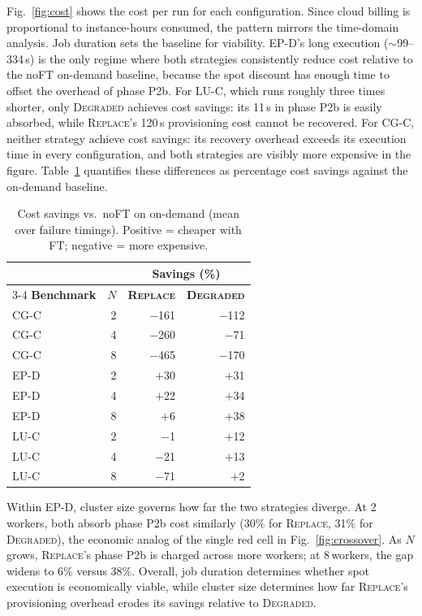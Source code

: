 \documentclass[conference]{IEEEtran}
\begin{document}
Fig.~\ref{fig:cost} shows the cost per run for each configuration. Since cloud billing
is proportional to instance-hours consumed, the pattern mirrors the time-domain analysis.
Job duration sets the baseline for viability.
EP-D's long execution ($\sim$99--334\,s) is the only regime where both strategies
consistently reduce cost relative to the noFT on-demand baseline, because the spot
discount has enough time to offset the overhead of phase P2b.
For LU-C, which runs roughly three times shorter, only \textsc{Degraded} achieves cost savings: its
11\,s in phase P2b is easily absorbed, while \textsc{Replace}'s 120\,s provisioning cost cannot
be recovered.
For CG-C, neither strategy achieve cost savings: its recovery overhead exceeds its execution time in
every configuration, and both strategies are visibly more expensive in the figure.
Table~\ref{tab:cost} quantifies these differences as percentage cost savings against the
on-demand baseline.

\begin{table}[t]
    \caption{Cost savings vs.\ noFT on on-demand (mean over failure timings).
             Positive = cheaper with FT; negative = more expensive.}
    \label{tab:cost}
    \centering
    \small
    \begin{tabular}{l r r r}
        \toprule
        & & \multicolumn{2}{c}{\textbf{Savings (\%)}} \\
        \cmidrule(lr){3-4}
        \textbf{Benchmark} & \textbf{$N$} & \textbf{\textsc{Replace}} & \textbf{\textsc{Degraded}} \\
        \midrule
        CG-C & 2 & $-$161 & $-$112 \\
        CG-C & 4 & $-$260 & $-$71  \\
        CG-C & 8 & $-$465 & $-$170 \\
        \addlinespace
        EP-D & 2 & $+$30  & $+$31  \\
        EP-D & 4 & $+$22  & $+$34  \\
        EP-D & 8 & $+$6   & $+$38  \\
        \addlinespace
        LU-C & 2 & $-$1   & $+$12  \\
        LU-C & 4 & $-$21  & $+$13  \\
        LU-C & 8 & $-$71  & $+$2   \\
        \bottomrule
    \end{tabular}
\end{table}

Within EP-D, cluster size governs how far the two strategies diverge. At 2\,workers,
both absorb phase P2b cost similarly (30\% for \textsc{Replace}, 31\% for
\textsc{Degraded}), the economic analog of the single red cell in
Fig.~\ref{fig:crossover}. As $N$ grows, \textsc{Replace}'s phase P2b is charged across more
workers; at 8\,workers, the gap widens to 6\% versus 38\%.
Overall, job duration determines whether spot execution is economically viable, while
cluster size determines how far \textsc{Replace}'s provisioning overhead erodes its
savings relative to \textsc{Degraded}.
\end{document}
